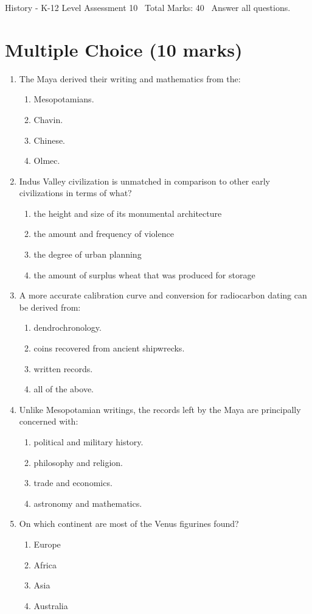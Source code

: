 \documentclass[12pt]{article}
\begin{document}
\begin{center}
History - K-12 Level Assessment 10 \
Total Marks: 40 \
Answer all questions.
\end{center}

\section*{Multiple Choice (10 marks)}
\begin{enumerate}[label=\arabic*.]
\item The Maya derived their writing and mathematics from the:
\begin{enumerate}[label=(\alph*)]
    \item Mesopotamians.
    \item Chavin.
    \item Chinese.
    \item Olmec.
\end{enumerate}
\item Indus Valley civilization is unmatched in comparison to other early civilizations in terms of what?
\begin{enumerate}[label=(\alph*)]
    \item the height and size of its monumental architecture
    \item the amount and frequency of violence
    \item the degree of urban planning
    \item the amount of surplus wheat that was produced for storage
\end{enumerate}
\item A more accurate calibration curve and conversion for radiocarbon dating can be derived from:
\begin{enumerate}[label=(\alph*)]
    \item dendrochronology.
    \item coins recovered from ancient shipwrecks.
    \item written records.
    \item all of the above.
\end{enumerate}
\item Unlike Mesopotamian writings, the records left by the Maya are principally concerned with:
\begin{enumerate}[label=(\alph*)]
    \item political and military history.
    \item philosophy and religion.
    \item trade and economics.
    \item astronomy and mathematics.
\end{enumerate}
\item On which continent are most of the Venus figurines found?
\begin{enumerate}[label=(\alph*)]
    \item Europe
    \item Africa
    \item Asia
    \item Australia
\end{enumerate}
\end{enumerate}
\end{document}
